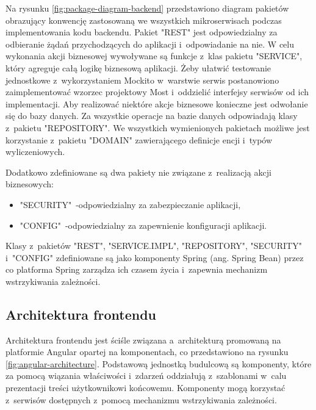 \noindent
{}

Na rysunku \ref{fig:package-diagram-backend} przedstawiono diagram pakietów obrazujący konwencję zastosowaną we wszystkich mikroserwisach podczas implementowania kodu backendu.
Pakiet "REST" jest odpowiedzialny za odbieranie żądań przychodzących do aplikacji i~odpowiadanie na nie.
W celu wykonania akcji biznesowej wywoływane są funkcje z~klas pakietu "SERVICE", który agreguje całą logikę biznesową aplikacji.
Żeby ułatwić testowanie jednostkowe z~wykorzystaniem Mockito w~warstwie serwis postanowiono zaimplementować wzorzec projektowy Most\cite{book:wzorce-projektowe} i~oddzielić interfejsy serwisów od ich implementacji.
Aby realizować niektóre akcje biznesowe konieczne jest odwołanie się do bazy danych.
Za wszystkie operacje na bazie danych odpowiadają klasy z~pakietu "REPOSITORY".
We wszystkich wymienionych pakietach możliwe jest korzystanie z~pakietu "DOMAIN" zawierającego definicje encji i~typów wyliczeniowych.

\par
Dodatkowo zdefiniowane są dwa pakiety nie związane z~realizacją akcji biznesowych:
\begin{itemize}
    \item "SECURITY"~-odpowiedzialny za zabezpieczanie aplikacji,
    \item "CONFIG"~-odpowiedzialny za zapewnienie konfiguracji aplikacji.
\end{itemize}

\par
Klasy z~pakietów "REST", "SERVICE.IMPL", "REPOSITORY", "SECURITY" i~"CONFIG" zdefiniowane są jako komponenty Spring (ang. Spring Bean) przez co platforma Spring zarządza ich czasem życia i~zapewnia mechanizm wstrzykiwania zależności\cite{book:spring-w-akcji}.

\subsection{Architektura frontendu}\label{subsec:system-architecture:frontend}

\noindent
{}

Architektura frontendu jest ściśle związana a~architekturą promowaną na platformie Angular opartej na komponentach,
co przedstawiono na rysunku \ref{fig:angular-architecture}.
Podstawową jednostką budulcową są komponenty, które za pomocą wiązania właściwości i~zdarzeń oddziałują z~szablonami w~calu prezentacji treści użytkownikowi końcowemu.
Komponenty mogą korzystać z~serwisów dostępnych z~pomocą mechanizmu wstrzykiwania zależności.

